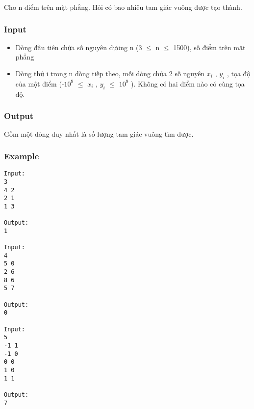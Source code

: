 



   Cho n điểm trên mặt phẳng. Hỏi có bao nhiêu tam giác vuông được tạo thành.  

\subsubsection{   Input  }
\begin{itemize}
	\item     Dòng đầu tiên chứa số nguyên dương n (3 $\le$ n $\le$ 1500), số điểm trên mặt phẳng   
	\item     Dòng thứ i trong n dòng tiếp theo, mỗi dòng chứa 2 số nguyên $x_{i}$    , $y_{i}$    , tọa độ của một điểm (-$10^{9}$     $\le$ $x_{i}$    , $y_{i}$     $\le$  $10^{9}$    ). Không có hai điểm nào có cùng tọa độ.   
\end{itemize}

\subsubsection{   Output  }

   Gồm một dòng duy nhất là số lượng tam giác vuông tìm được.  

\subsubsection{   Example  }
\begin{verbatim}
Input:
3
4 2
2 1
1 3

Output:
1

Input:
4
5 0
2 6
8 6
5 7

Output:
0

Input:
5
-1 1
-1 0
0 0
1 0
1 1

Output:
7
\end{verbatim}
